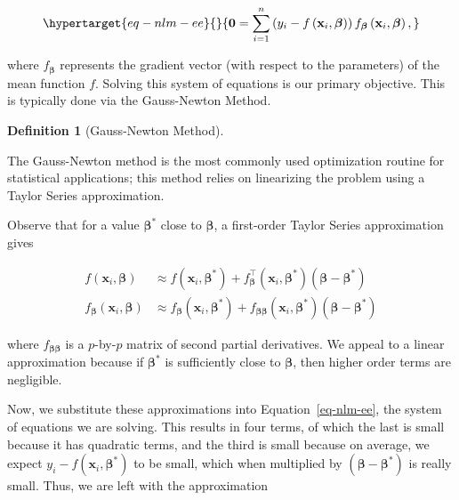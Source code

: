 \documentclass[
  letterpaper,
  DIV=11,
  numbers=noendperiod]{scrreprt}
\theoremstyle{definition}
\newtheorem{definition}{Definition}[chapter]
\theoremstyle{definition}
\theoremstyle{remark}
\begin{document}
\begin{equation}\protect\hypertarget{eq-nlm-ee}{}{\mathbf{0} = \sum_{i=1}^{n} \left(y_i - f\left(\mathbf{x}_i, \boldsymbol{\beta}\right)\right) f_{\boldsymbol{\beta}}\left(\mathbf{x}_i, \boldsymbol{\beta}\right),}\label{eq-nlm-ee}\end{equation}

where \(f_{\boldsymbol{\beta}}\) represents the gradient vector (with
respect to the parameters) of the mean function \(f\). Solving this
system of equations is our primary objective. This is typically done via
the Gauss-Newton Method.

\begin{definition}[Gauss-Newton
Method]\protect\hypertarget{def-gauss-newton}{}\label{def-gauss-newton}

The Gauss-Newton method is the most commonly used optimization routine
for statistical applications; this method relies on linearizing the
problem using a Taylor Series approximation.

\end{definition}

Observe that for a value \(\boldsymbol{\beta}^*\) close to
\(\boldsymbol{\beta}\), a first-order Taylor Series approximation gives

\[
\begin{aligned}
  f\left(\mathbf{x}_i,\boldsymbol{\beta}\right)
    &\approx f\left(\mathbf{x}_i,\boldsymbol{\beta}^*\right) + f^\top_{\boldsymbol{\beta}}\left(\mathbf{x}_i,\boldsymbol{\beta}^*\right)\left(\boldsymbol{\beta} - \boldsymbol{\beta}^*\right) \\
  f_{\boldsymbol{\beta}}\left(\mathbf{x}_i,\boldsymbol{\beta}\right)
    &\approx f_{\boldsymbol{\beta}}\left(\mathbf{x}_i,\boldsymbol{\beta}^*\right) + f_{\boldsymbol{\beta}\boldsymbol{\beta}}\left(\mathbf{x}_i,\boldsymbol{\beta}^*\right)\left(\boldsymbol{\beta} - \boldsymbol{\beta}^*\right)
\end{aligned}
\]

where \(f_{\boldsymbol{\beta}\boldsymbol{\beta}}\) is a \(p\)-by-\(p\)
matrix of second partial derivatives. We appeal to a linear
approximation because if \(\boldsymbol{\beta}^*\) is sufficiently close
to \(\boldsymbol{\beta}\), then higher order terms are negligible.

Now, we substitute these approximations into Equation~\ref{eq-nlm-ee},
the system of equations we are solving. This results in four terms, of
which the last is small because it has quadratic terms, and the third is
small because on average, we expect
\(y_i - f(\mathbf{x}_i,\boldsymbol{\beta}^*)\) to be small, which when
multiplied by \((\boldsymbol{\beta} - \boldsymbol{\beta}^*)\) is really
small. Thus, we are left with the approximation
\end{document}
